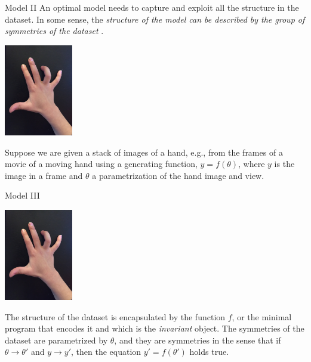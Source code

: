 \begin{frame}[label=ladila]{Model II}
An optimal model needs to capture and exploit all the structure in the dataset. In some sense, the {\em structure of the model can be described by the group of symmetries of the dataset}  \citep{Ruffini:2016ad}. 
 \begin{center}%
  \includegraphics[height=4cm]{img/hand.jpeg}
  \end{center}
  
Suppose we are given a stack of images of a hand, e.g., from the frames of a movie of a moving hand  using a generating function,
$y = f(\theta)$, where $y$ is the image in a frame and $\theta$ a parametrization of the hand image and view.
\end{frame}

\begin{frame}[label=ladila]{Model III}
 \begin{center}%
  \includegraphics[height=4cm]{img/hand.jpeg}
  \end{center}
  The structure of the dataset is encapsulated by the function $f$, or the minimal program that encodes it and which is the {\em invariant} object.  The symmetries of the dataset are parametrized by $\theta$, and they are symmetries in the sense that if $\theta\rightarrow \theta'$ and $y\rightarrow y'$, then the equation $y'=f(\theta')$ holds true.
\end{frame}